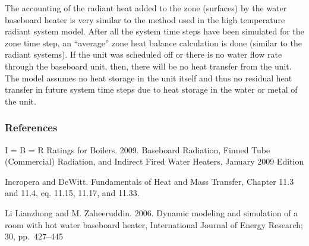The accounting of the radiant heat added to the zone (surfaces) by the water baseboard heater is very similar to the method used in the high temperature radiant system model. After all the system time steps have been simulated for the zone time step, an ``average'' zone heat balance calculation is done (similar to the radiant systems). If the unit was scheduled off or there is no water flow rate through the baseboard unit, then, there will be no heat transfer from the unit. The model assumes no heat storage in the unit itself and thus no residual heat transfer in future system time steps due to heat storage in the water or metal of the unit.

\subsubsection{References}\label{references-2-001}

I = B = R Ratings for Boilers. 2009. Baseboard Radiation, Finned Tube (Commercial) Radiation, and Indirect Fired Water Heaters, January 2009 Edition

Incropera and DeWitt. Fundamentals of Heat and Mass Transfer, Chapter 11.3 and 11.4, eq. 11.15, 11.17, and 11.33.

Li Lianzhong and M. Zaheeruddin. 2006. Dynamic modeling and simulation of a room with hot water baseboard heater, International Journal of Energy Research; 30, pp.~427--445
